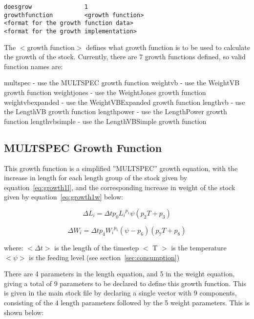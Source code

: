 \documentclass[10pt,twoside]{book}
\begin{document}
{\small\begin{verbatim}
doesgrow               1
growthfunction         <growth function>
<format for the growth function data>
<format for the growth implementation>
\end{verbatim}}

The $<$growth function$>$ defines what growth function is to be used to calculate the growth of the stock.  Currently, there are 7 growth functions defined, so valid function names are:

\bigskip
multspec - use the MULTSPEC growth function\newline
weightvb - use the WeightVB growth function\newline
weightjones - use the WeightJones growth function\newline
weightvbexpanded - use the WeightVBExpanded growth function\newline
lengthvb - use the LengthVB growth function\newline
lengthpower - use the LengthPower growth function\newline
lengthvbsimple - use the LengthVBSimple growth function

\subsection{MULTSPEC Growth Function}\label{subsec:growth1}
This growth function is a simplified ''MULTSPEC'' growth equation, with the increase in length for each length group of the stock given by equation~\ref{eq:growth1l}, and the corresponding increase in weight of the stock given by equation~\ref{eq:growth1w} below:

\begin{equation}\label{eq:growth1l}
\Delta L_{i} = \Delta t p_{0} {L_{i}}^{p_{1}} \psi (p_{2} T + p_{3})
\end{equation}

\begin{equation}\label{eq:growth1w}
\Delta W_{i} = \Delta t p_{4} {W_{i}}^{p_{5}} (\psi - p_{6}) (p_{7} T + p_{8})
\end{equation}

where:\newline
$<\Delta t>$ is the length of the timestep\newline
$<$ T $>$ is the temperature\newline
$<\psi>$ is the feeding level (see section~\ref{sec:consumption})

\bigskip
There are 4 parameters in the length equation, and 5 in the weight equation, giving a total of 9 parameters to be declared to define this growth function.  This is given in the main stock file by declaring a single vector with 9 components, consisting of the 4 length parameters followed by the 5 weight parameters.  This is shown below:
\end{document}
